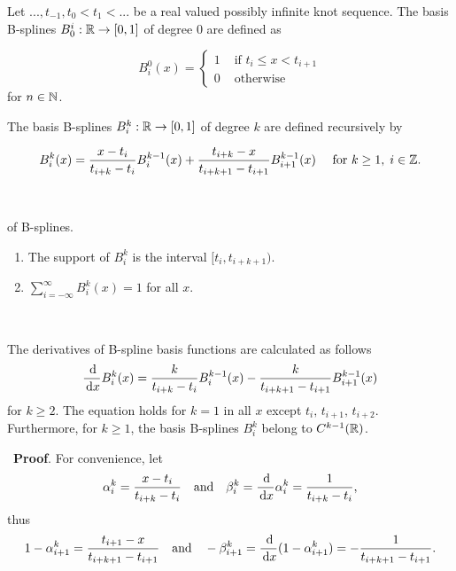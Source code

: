\begin{definition}\label{Bspline}
Let $...,t_{-1},t_0<t_1<...$ be a real valued possibly infinite knot sequence. The basis B-splines $B_0^i: \mathbb R \to [0,1]$ of degree 0 are defined as

\begin{equation}
  B_i^0(x) = 
  \begin{cases}
    1 & \mbox{ if } t_i\leq x < t_{i+1}\\
    0 & \mbox{ otherwise}
  \end{cases}
\end{equation}
for $n\in\mathbb N$.

The basis B-splines $B_i^k:\mathbb R\to [0,1]$ of degree $k$ are defined recursively by

\begin{equation}
  B_i^k(x) = \frac{x-t_i}{t_{i+k}-t_i} B_i^{k-1}(x) + \frac{t_{i+k}-x}{t_{i+k+1}-t_{i+1}} B_{i+1}^{k-1}(x) \quad \text{ for } k\geq 1,\;i\in \Z.\label{recurDef}
\end{equation}
\end{definition}\

\begin{remark} of B-splines.
  \begin{enumerate}
    \item The support of $B_i^k$ is the interval $[t_i,t_{i+k+1})$.
    \item $\displaystyle\sum_{i=-\infty}^\infty B_i^k(x) = 1$ for all $x$.\label{property2}
  \end{enumerate}
\end{remark}\

\begin{lemma}\label{derBspline}
  The derivatives of B-spline basis functions are calculated as follows
  \begin{equation}
    \frac{\df}{\df x} B_i^k(x) = \frac{k}{t_{i+k}-t_i}B_i^{k-1}(x) - \frac{k}{t_{i+k+1}-t_{i+1}}B_{i+1}^{k-1}(x)\label{DerBspline}
  \end{equation}
  for $k\geq 2$. The equation holds for $k=1$ in all $x$ except $t_i,\,t_{i+1},\,t_{i+2}$.
  Furthermore, for $k\geq 1$, the basis B-splines $B_i^k$ belong to $C^{k-1}(\mathbb R)$.
\end{lemma}\
\textbf{Proof}. For convenience, let 
\[
  \alpha_i^k = \frac{x-t_i}{t_{i+k}-t_{i}} \quad\mbox{and}\quad \beta_i^k = \frac{\,{\rm d}}{\,{\rm d} x} \alpha_i^k = \frac{1}{t_{i+k}-t_{i}},
\]
thus
\[
  1-\alpha_{i+1}^k = \frac{t_{i+1}-x}{t_{i+k+1}-t_{i+1}} \quad\mbox{and}\quad -\beta_{i+1}^k = \frac{\,{\rm d}}{\,{\rm d} x} (1-\alpha_{i+1}^k) = -\frac{1}{t_{i+k+1}-t_{i+1}}.
\]


